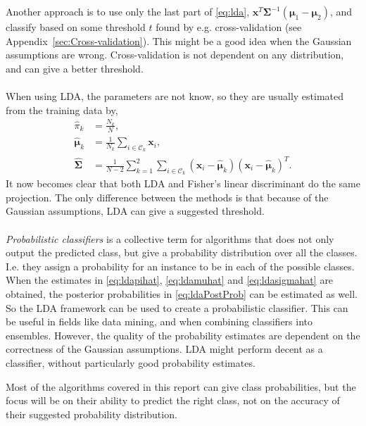 Another approach is to use only the last part of \eqref{eq:lda}, $\mathbf{x}^T\bm{\Sigma}^{-1} (\bm \mu_1-\bm \mu_2)$, and classify based on some threshold $t$ found by e.g. cross-validation (see Appendix~\ref{sec:Cross-validation}). This might be a good idea when the Gaussian assumptions are wrong. Cross-validation is not dependent on any distribution, and can give a better threshold. 
\\
\\
When using LDA, the parameters are not know, so they are usually estimated from the training data by,
\begin{align}
  \label{eq:ldapihat} 
   \hat{\pi}_k &= \frac{N_k}{N},  \\
  \label{eq:ldamuhat} 
   \hat{\bm \mu}_k &= \frac{1}{N_k} \sum_{i \in \mathcal{C}_k}\mathbf{x}_i, \\
  \label{eq:ldasigmahat} 
   \hat{\bm \Sigma} &= \frac{1}{N-2} \sum_{k = 1}^{2} \sum_{i \in \mathcal{C}_k}(\mathbf{x}_i - \hat{\bm{\mu}}_k)(\mathbf{x}_i - \hat{\bm{\mu}}_k)^T.
\end{align}
It now becomes clear that both LDA and Fisher's linear discriminant do the same projection. The only difference between the methods is that because of the Gaussian assumptions, LDA can give a suggested threshold.
\\
\\
\textit{Probabilistic classifiers} is a collective term for algorithms that does not only output the predicted class, but give a probability distribution over all the classes. 
I.e. they assign a probability for an instance to be in each of the possible classes.  
When the estimates in \eqref{eq:ldapihat}, \eqref{eq:ldamuhat} and \eqref{eq:ldasigmahat} are obtained, the posterior probabilities in \eqref{eq:ldaPostProb} can be estimated as well. So the LDA framework can be used to create a probabilistic classifier.
This can be useful in fields like data mining, and when combining classifiers into ensembles. However, the quality of the probability estimates are dependent on the correctness of the Gaussian assumptions. LDA might perform decent as a classifier, without particularly good probability estimates. 

Most of the algorithms covered in this report can give class probabilities, but the focus will be on their ability to predict the right class, not on the accuracy of their suggested probability distribution.
%
